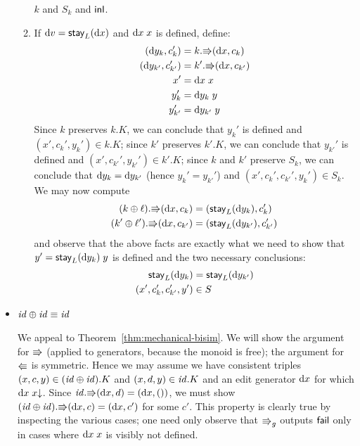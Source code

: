 \begin{pf}
\begin{itemize}
\begin{enumerate}
                    $k$ and $S_k$ and $\mathsf{inl}$.
                \item If $\textrm{d} v=\mathsf{stay}_L(\textrm{d} x)$ and $\textrm{d} x\;x$ is defined,
                    define:
                    \begin{align*}
                        (\textrm{d} y_k,c_k') &= k.\mathord{\Rrightarrow}(\textrm{d} x,c_k) \\
                        (\textrm{d} y_{k'},c_{k'}') &= k'.\mathord{\Rrightarrow}(\textrm{d} x,c_{k'}) \\
                        x' &= \textrm{d} x\;x \\
                        y_k' &= \textrm{d} y_k\;y \\
                        y_{k'}' &= \textrm{d} y_{k'}\;y
                    \end{align*}
                    Since $k$ preserves $k.K$, we can conclude that $y_k'$
                    is defined and $(x',c_k',y_k') \in k.K$; since $k'$
                    preserves $k'.K$, we can conclude that $y_{k'}'$ is
                    defined and $(x',c_{k'}',y_{k'}') \in k'.K$; since $k$
                    and $k'$ preserve $S_k$, we can conclude that
                    $\textrm{d} y_k=\textrm{d} y_{k'}$ (hence $y_k' = y_{k'}'$) and
                    $(x',c_k',c_{k'}',y_k') \in S_k$. We may now compute
                    \begin{align*}
                        (k\oplus\ell).\mathord{\Rrightarrow}(\textrm{d} x,{c_k}) &=
                        (\mathsf{stay}_L(\textrm{d} y_k),{c_k'}) \\
                        (k'\oplus\ell').\mathord{\Rrightarrow}(\textrm{d} x,{c_{k'}}) &=
                        (\mathsf{stay}_L(\textrm{d} y_{k'}),{c_{k'}'})
                    \end{align*}
                    and observe that the above facts are exactly what we
                    need to show that $y' = \mathsf{stay}_L(\textrm{d} y_k)\; y$ is
                    defined and the two necessary conclusions:
                    \begin{align*}
                        \mathsf{stay}_L(\textrm{d} y_k) &= \mathsf{stay}_L(\textrm{d} y_{k'}) \\
                        (x',c_k',c_{k'}',y') &\in S
                    \end{align*}
            \end{enumerate}

        \item $\mathit{id}\oplus\mathit{id}\equiv\mathit{id}$

            We appeal to Theorem~\ref{thm:mechanical-bisim}. We will show
            the argument for $\mathord{\Rrightarrow}$ (applied to generators, because the
            monoid is free); the argument for $\mathord{\Lleftarrow}$ is symmetric. Hence
            we may assume we have consistent triples $(x,c,y) \in
            (\mathit{id}\oplus\mathit{id}).K$ and $(x,d,y) \in \mathit{id}.K$ and an edit generator
            $\textrm{d} x$ for which $\textrm{d} x\;x{\downarrow}$. Since
            $\mathit{id}.\mathord{\Rrightarrow}(\textrm{d} x,d)=(\textrm{d} x,{()})$, we must show
            $(\mathit{id}\oplus\mathit{id}).\mathord{\Rrightarrow}(\textrm{d} x,c)=(\textrm{d} x,c')$ for some $c'$. This
            property is clearly true by inspecting the various cases; one
            need only observe that $\mathord{\Rrightarrow}_g$ outputs $\mathsf{fail}$ only in
            cases where $\textrm{d} x\;x$ is visibly not defined.


\end{itemize}
\end{pf}

